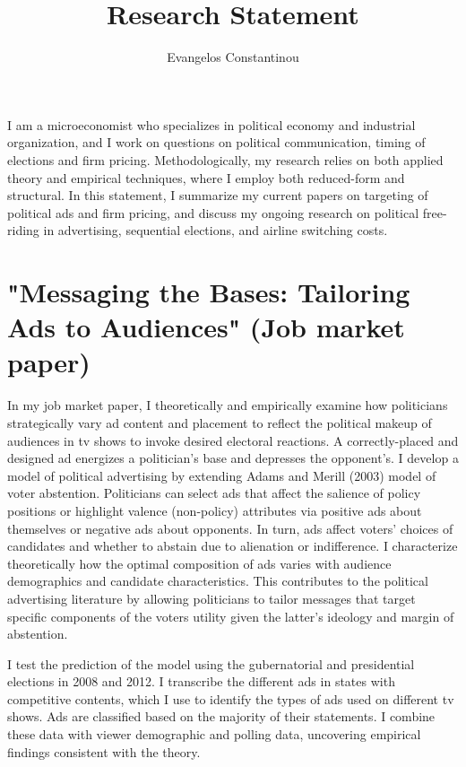 \documentclass[12pt]{article}
\author{Evangelos Constantinou}
\date{}
\title{\bf{Research Statement}}
\begin{document}
\maketitle
I am a microeconomist who specializes in political economy and industrial organization, and I work on questions on political communication, timing of elections and firm pricing.
Methodologically, my research relies on both applied theory and empirical techniques, where I employ both reduced-form and structural.
In this statement, I summarize my current papers on targeting of political ads and firm pricing, and discuss my ongoing research on political free-riding in advertising, sequential elections, and airline switching costs.

\vspace{0.25cm}

\section{"Messaging the Bases: Tailoring Ads to Audiences" (Job market paper)}
\label{sec:orgcad1a0b}
\vspace{0.1cm}

\noindent
In my job market paper, I theoretically and empirically examine how politicians strategically vary ad content and placement to reflect the political makeup of audiences in tv shows to invoke desired electoral reactions.
A correctly-placed and designed ad energizes a politician's base and depresses the opponent's.
I develop a model of political advertising by extending Adams and Merill (2003) model of voter abstention.
Politicians can select ads that affect the salience of policy positions or highlight valence (non-policy) attributes via positive ads about themselves or negative ads about opponents.
In turn, ads affect voters’ choices of candidates and whether to abstain due to alienation or indifference.
I characterize theoretically how the optimal composition of ads varies with audience demographics and candidate characteristics.
This contributes to the political advertising literature by allowing politicians to tailor messages that target specific components of the voters utility given the latter's ideology and margin of abstention.

I test the prediction of the model using the gubernatorial and presidential elections in 2008 and 2012.
I transcribe the different ads in states with competitive contents, which I use to identify the types of ads used on different tv shows.
Ads are classified based on the majority of their statements.
I combine these data with viewer demographic and polling data, uncovering empirical findings consistent with the theory.
\end{document}
